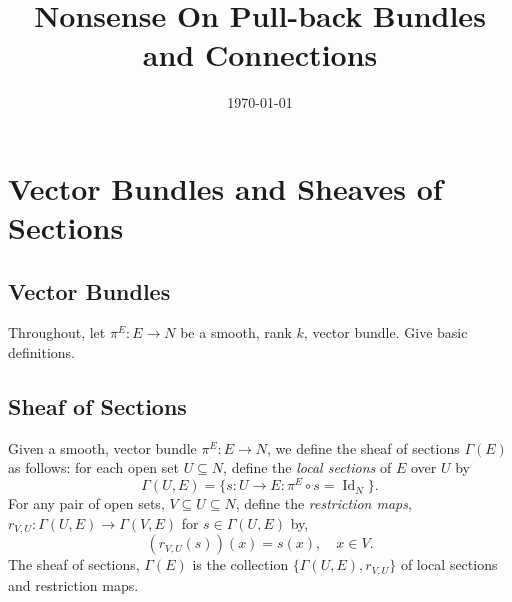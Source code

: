 \documentclass{amsart}
\begin{document}
\title[Pull-back Bundle Nonsense]
 {Nonsense On Pull-back Bundles and Connections}

\curraddr{}
\email{}
\date{\today}

\dedicatory{}
\subjclass[2010]{}
\keywords{}

\maketitle

\section{Vector Bundles and Sheaves of Sections}

\subsection{Vector Bundles}

Throughout, let \(\pi^E : E \to N\) be a smooth, rank \(k\), vector bundle. Give basic definitions.

\subsection{Sheaf of Sections}

\begin{defn}
Given a smooth, vector bundle \(\pi^E : E \to N\), we define the sheaf of sections \(\Gamma(E)\) as follows: for each open set \(U \subseteq N\), define the \emph{local sections} of \(E\) over \(U\) by
\[
\Gamma(U, E) = \{s : U \to E : \pi^E \circ s = \operatorname{Id}_N\}.
\]
For any pair of open sets, \(V \subseteq U \subseteq N\), define the \emph{restriction maps}, \(r_{V,U} : \Gamma(U, E) \to \Gamma(V, E)\) for \(s \in \Gamma(U, E)\) by,
\[
(r_{V,U} (s)) (x) = s(x), \quad x \in V.
\]
The sheaf of sections, \(\Gamma(E)\) is the collection \(\{\Gamma(U, E), r_{V,U}\}\) of local sections and restriction maps.
\end{defn}
\end{document}
